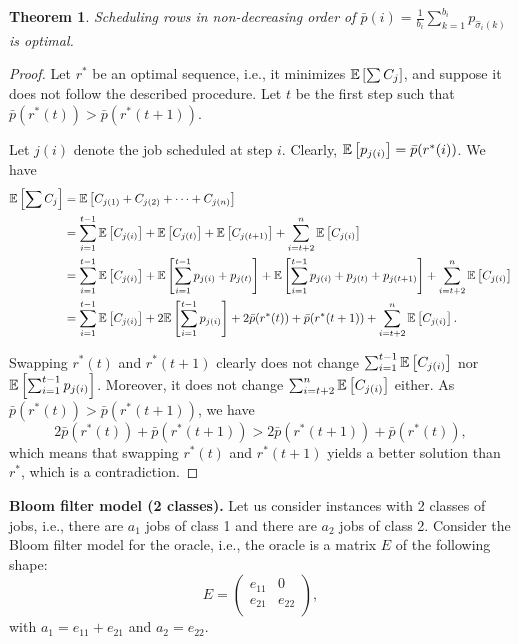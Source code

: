 \documentclass{article}
\newtheorem{theorem}{Theorem}
\begin{document}
\begin{theorem}
    Scheduling rows in non-decreasing order of \(\bar{p}(i)=\frac{1}{b_i} \sum_{k=1}^{b_i} p_{\hat{\sigma}_i(k)}\) is optimal.
\end{theorem}
\begin{proof}
    Let \(r^*\) be an optimal sequence, i.e., it minimizes \(\mathbb{E}\left[\sum C_j\right]\), and suppose it does not follow the described procedure.
    Let \(t\) be the first step such that \(\bar{p}(r^*(t))>\bar{p}(r^*(t+1))\).

    Let \(j(i)\) denote the job scheduled at step \(i\).
    Clearly, \(\mathbb{E}\left[p_{j(i)}\right]=\bar{p}(r^*(i))\).
    We have
    \begin{align*}
        \mathbb{E}\left[\sum C_j\right]
        &=\mathbb{E}\left[C_{j(1)}+C_{j(2)}+\cdots+C_{j(n)}\right]\\
        &=\sum_{i=1}^{t-1}\mathbb{E}\left[C_{j(i)}\right]+\mathbb{E}\left[C_{j(t)}\right]+\mathbb{E}\left[C_{j(t+1)}\right]+\sum_{i=t+2}^n \mathbb{E}\left[C_{j(i)}\right]\\
        &=\sum_{i=1}^{t-1}\mathbb{E}\left[C_{j(i)}\right]+\mathbb{E}\left[\sum_{i=1}^{t-1} p_{j(i)}+p_{j(t)}\right]+\mathbb{E}\left[\sum_{i=1}^{t-1} p_{j(i)}+p_{j(t)}+p_{j(t+1)}\right]+\sum_{i=t+2}^n \mathbb{E}\left[C_{j(i)}\right]\\
        &=\sum_{i=1}^{t-1}\mathbb{E}\left[C_{j(i)}\right]+2\mathbb{E}\left[\sum_{i=1}^{t-1} p_{j(i)}\right]+2\bar{p}(r^*(t))+\bar{p}(r^*(t+1))+\sum_{i=t+2}^n \mathbb{E}\left[C_{j(i)}\right].
    \end{align*}

    Swapping \(r^*(t)\) and \(r^*(t+1)\) clearly does not change \(\sum_{i=1}^{t-1}\mathbb{E}\left[C_{j(i)}\right]\) nor \(\mathbb{E}\left[\sum_{i=1}^{t-1} p_{j(i)}\right]\).
    Moreover, it does not change \(\sum_{i=t+2}^n \mathbb{E}\left[C_{j(i)}\right]\) either.
    As \(\bar{p}(r^*(t))>\bar{p}(r^*(t+1))\), we have
    \[
        2\bar{p}(r^*(t))+\bar{p}(r^*(t+1))>2\bar{p}(r^*(t+1))+\bar{p}(r^*(t)),
    \]
    which means that swapping \(r^*(t)\) and \(r^*(t+1)\) yields a better solution than \(r^*\), which is a contradiction.
\end{proof}

\noindent\textbf{Bloom filter model (2 classes).}
Let us consider instances with 2 classes of jobs, i.e., there are \(a_1\) jobs of class 1 and there are \(a_2\) jobs of class 2.
Consider the Bloom filter model for the oracle, i.e., the oracle is a matrix \(E\) of the following shape:
\[
    E=\begin{pmatrix}
        e_{11} & 0 \\
        e_{21} & e_{22} \\
    \end{pmatrix},
\]
with \(a_1=e_{11}+e_{21}\) and \(a_2=e_{22}\).
\end{document}
